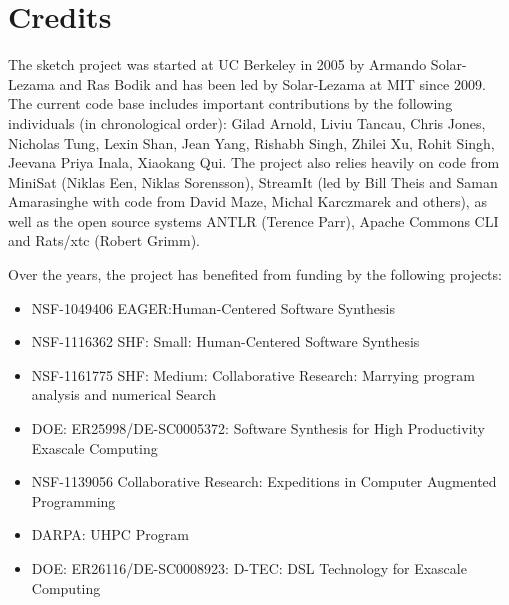 \section{Credits}

The sketch project was started at UC Berkeley in 2005 by Armando Solar-Lezama and Ras Bodik and has been led by Solar-Lezama at MIT since 2009. The current code base includes important contributions by the following individuals (in chronological order): 
Gilad Arnold,
Liviu Tancau,
Chris Jones,
Nicholas Tung,
Lexin Shan,
Jean Yang,
Rishabh Singh,
Zhilei Xu,
Rohit Singh,
Jeevana Priya Inala,
Xiaokang Qui.
The project also relies heavily on code from MiniSat (Niklas Een, Niklas Sorensson), StreamIt (led by Bill Theis and Saman Amarasinghe with code from David Maze, Michal Karczmarek and others), as well as the open source systems ANTLR (Terence Parr), Apache Commons CLI and Rats/xtc (Robert Grimm).

Over the years, the project has benefited from funding by the following projects:
\begin{itemize}
\item NSF-1049406 EAGER:Human-Centered Software Synthesis
\item NSF-1116362  SHF: Small: Human-Centered Software Synthesis
\item NSF-1161775 SHF: Medium: Collaborative Research: Marrying program analysis and numerical Search
\item DOE: ER25998/DE-SC0005372: Software Synthesis for High Productivity Exascale Computing
\item NSF-1139056 Collaborative Research: Expeditions in Computer Augmented Programming
\item DARPA: UHPC Program
\item DOE: ER26116/DE-SC0008923: D-TEC: DSL Technology for Exascale Computing 
\end{itemize}


